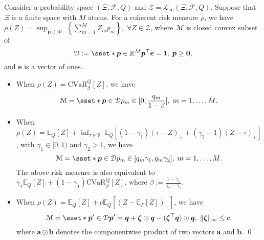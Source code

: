 \documentclass[final,onefignum,onetabnum]{class}
\newcommand{\ee}[2]{\mathbb{E}_{#1} \left[ #2 \right]}
\newcommand{\cccvar}[3]{\mathrm{CVaR}^{#1}_{#2} \left[ #3 \right]}
\newcommand{\bs}[1]{\boldsymbol{#1}} %
\newcommand{\Bs}[1]{\mathbb{#1}} %
\newcommand{\Cs}[1]{\mathcal{#1}} %
\newcommand{\Pspace}[1]{\left( \Xi, \Cs{F}, #1 \right)}
\begin{document}
\begin{example}
    \label{ex: rev.CVaR_dual}
    Consider a probability space $\Pspace{Q}$ and $\Cs{Z}=\Cs{L}_{\infty}\Pspace{Q}$. Suppose that $\Xi$ is a finite space with $M$ atoms. %
    For a coherent risk measure $\rho$, we have $\rho(Z)= \sup_{\bs{p} \in \Cs{M}} \ \left \lbrace  \sum_{m=1}^{M} Z_{m} p_{m} \right \rbrace, \; \forall Z \in \Cs{Z}$,
    where $\Cs{M}$ is closed convex subset of $$\Cs{D}:=\sset*{\bs{p} \in \Bs{R}^{M}}{ \bs{p}^{\top}\bs{e}=1, \;  \bs{p} \ge \bs{0}},$$
    and $\bs{e}$ is a vector of ones. 
    \begin{itemize}
        \item When $\rho(Z)=\cccvar{Q}{\beta}{Z}$, we have $$\Cs{M}= \sset*{\bs{p} \in \Cs{D}}{ p_{m} \in [0, \frac{q_{m}}{1-\beta}], \; m=1, \ldots, M}.$$
        
        \item When $\rho(Z)=\ee{Q}{Z}+ \inf_{\tau \in \Bs{R}} \ \ee{Q}{(1-\gamma_{1})(\tau-Z)_{+} + (\gamma_{2}-1)(Z-\tau)_{+}}$, with $\gamma_{1} \in [0,1)$ and $\gamma_{2}>1$, we have 
        $$\Cs{M}= \sset*{\bs{p} \in \Cs{D}}{ p_{m} \in [q_{m}\gamma_{1}, q_{m}\gamma_{2} ], \; m=1, \ldots, M}.$$ 
        The above risk measure is also equivalent to $\gamma_{1} \ee{Q}{Z}+ (1-\gamma_{1})\cccvar{Q}{\beta}{Z}$, where $\beta:=\frac{1-\gamma_{1}}{\gamma_{2}-\gamma_{1}}$. 
        
        \item When $\rho(Z)=\ee{Q}{Z} + c\ee{Q}{(Z-\ee{P}{Z})_{+}}$, we have 
        $$\Cs{M}= \sset*{\bs{p}^{\prime} \in \Cs{D}}{ \bs{p}^{\prime}= \bs{q} + \bs{\zeta} \odot \bs{q} - (\bs{\zeta}^{\top}\bs{q}) \odot \bs{q}, \; \|\bs{\zeta}\|_{\infty} \le c},$$
        where $\bs{a} \odot \bs{b}$ denotes the componentwise product of two vectors $\bs{a}$ and $\bs{b}$. 
        \qed
    \end{itemize}
    
\end{example}
\end{document}
